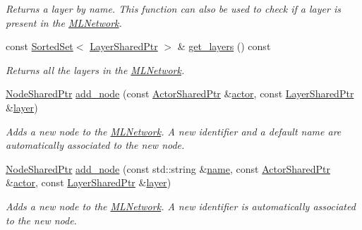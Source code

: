 \begin{DoxyCompactItemize}
\begin{DoxyCompactList}\small\item\em Returns a layer by name. This function can also be used to check if a layer is present in the \hyperlink{classmlnet_1_1_m_l_network}{M\+L\+Network}. \end{DoxyCompactList}\item 
const \hyperlink{classmlnet_1_1_sorted_set}{Sorted\+Set}$<$ \hyperlink{namespacemlnet_a10c007fb811c55339dd5b9d32bb0505d}{Layer\+Shared\+Ptr} $>$ \& \hyperlink{classmlnet_1_1_m_l_network_a1ff6d760dd7aabdcf889c30107025354}{get\+\_\+layers} () const 
\begin{DoxyCompactList}\small\item\em Returns all the layers in the \hyperlink{classmlnet_1_1_m_l_network}{M\+L\+Network}. \end{DoxyCompactList}\item 
\hyperlink{namespacemlnet_acf8b1b6deb52e7dacfc676c689f9a10c}{Node\+Shared\+Ptr} \hyperlink{classmlnet_1_1_m_l_network_a4ee0a93e953d9807f3db3ee70a475faf}{add\+\_\+node} (const \hyperlink{namespacemlnet_a714fd98ffaeaadd5c38d61fa53dc4d24}{Actor\+Shared\+Ptr} \&\hyperlink{classmlnet_1_1actor}{actor}, const \hyperlink{namespacemlnet_a10c007fb811c55339dd5b9d32bb0505d}{Layer\+Shared\+Ptr} \&\hyperlink{classmlnet_1_1layer}{layer})
\begin{DoxyCompactList}\small\item\em Adds a new node to the \hyperlink{classmlnet_1_1_m_l_network}{M\+L\+Network}. A new identifier and a default name are automatically associated to the new node. \end{DoxyCompactList}\item 
\hyperlink{namespacemlnet_acf8b1b6deb52e7dacfc676c689f9a10c}{Node\+Shared\+Ptr} \hyperlink{classmlnet_1_1_m_l_network_ad39a45f153b4dc69f6585d1fcd39ab3f}{add\+\_\+node} (const std\+::string \&\hyperlink{classmlnet_1_1_m_l_network_aa2e1496321423e15a8e97e0daed30ca7}{name}, const \hyperlink{namespacemlnet_a714fd98ffaeaadd5c38d61fa53dc4d24}{Actor\+Shared\+Ptr} \&\hyperlink{classmlnet_1_1actor}{actor}, const \hyperlink{namespacemlnet_a10c007fb811c55339dd5b9d32bb0505d}{Layer\+Shared\+Ptr} \&\hyperlink{classmlnet_1_1layer}{layer})
\begin{DoxyCompactList}\small\item\em Adds a new node to the \hyperlink{classmlnet_1_1_m_l_network}{M\+L\+Network}. A new identifier is automatically associated to the new node. \end{DoxyCompactList}\item 

\end{DoxyCompactItemize}
